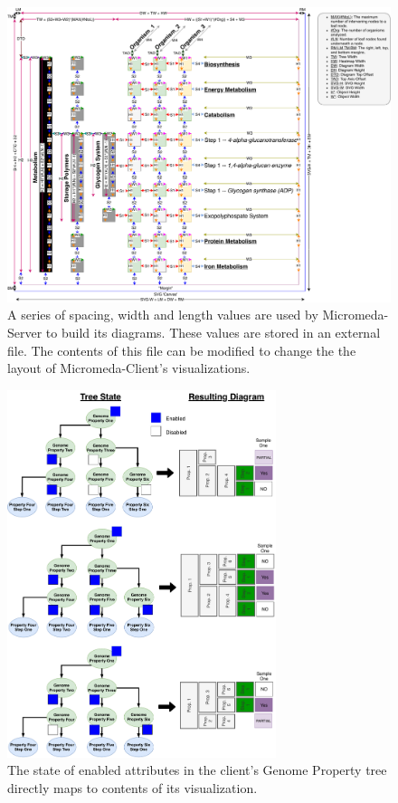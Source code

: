 \begin{figure}[!ht]
  \centering
	\includegraphics[width=\textwidth]{media/diagram_measurements.pdf}
	 \caption{A series of spacing, width and length values are used by Micromeda-Server to build its diagrams. These values are stored in an external file. The contents of this file can be modified to change the the layout of Micromeda-Client's visualizations.}
	 \label{fig:diagram-measurements}
\end{figure}

\begin{figure}[!ht]
  \centering
	\includegraphics[width=0.7\textwidth]{media/how_tree_state_maps.pdf}
	 \caption{The state of enabled attributes in the client's Genome Property tree directly maps to contents of its visualization.}
	 \label{fig:tree-map-to-viz}
\end{figure}


